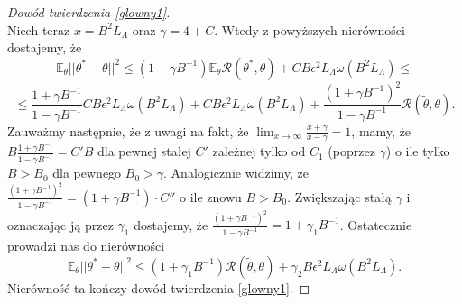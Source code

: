 \documentclass{mwart}
\begin{document}
\begin{proof}[Dowód twierdzenia \ref{glowny1}]
\begin{displaymath}
\end{displaymath}
Niech teraz $x=B^2L_{\Lambda}$ oraz $\gamma=4+C$. Wtedy z powyższych nierówności dostajemy, że 
\begin{displaymath}
\mathbb{E}_{\theta}||\theta^*-\theta||^2\leq (1+\gamma B^{-1})\mathbb{E}_{\theta}\mathcal{R}(\theta^*,\theta)+CB\epsilon^2L_{\Lambda}\omega (B^2L_{\Lambda})\leq
\end{displaymath}
\begin{displaymath}
\leq \frac{1+\gamma B^{-1}}{1-\gamma B^{-1}}CB\epsilon^2L_{\Lambda}\omega (B^2L_{\Lambda})+CB\epsilon^2L_{\Lambda}\omega (B^2L_{\Lambda})+\frac{(1+\gamma B^{-1})^2}{1-\gamma B^{-1}}\mathcal{R}(\tilde{\theta},\theta).
\end{displaymath}
Zauważmy następnie, że z uwagi na fakt, że $\lim_{x\to \infty}\frac{x+\gamma}{x-\gamma}=1$, mamy, że 
$B\frac{1+\gamma B^{-1}}{1-\gamma B^{-1}}=C'B$ dla pewnej stałej $C'$ zależnej tylko od $C_1$ (poprzez $\gamma$) o ile tylko $B>B_0$ dla pewnego $B_0>\gamma$. Analogicznie widzimy, że  $\frac{(1+\gamma B^{-1})^2}{1-\gamma B^{-1}}=(1+\gamma B^{-1})\cdot C''$ o ile znowu $B>B_0$. Zwiększając stałą $\gamma$ i oznaczając ją przez $\gamma_1$ dostajemy, że $\frac{(1+\gamma B^{-1})^2}{1-\gamma B^{-1}}=1+\gamma_1B^{-1}$. Ostatecznie prowadzi nas do nierówności 
\begin{displaymath}
\mathbb{E}_{\theta}||\theta^*-\theta||^2\leq (1+\gamma_1B^{-1})\mathcal{R}(\tilde{\theta},\theta)+\gamma_2B\epsilon^2L_{\Lambda}\omega (B^2L_{\Lambda}).
\end{displaymath}
Nierówność ta kończy dowód twierdzenia \ref{glowny1}.
\end{proof}
\end{document}
